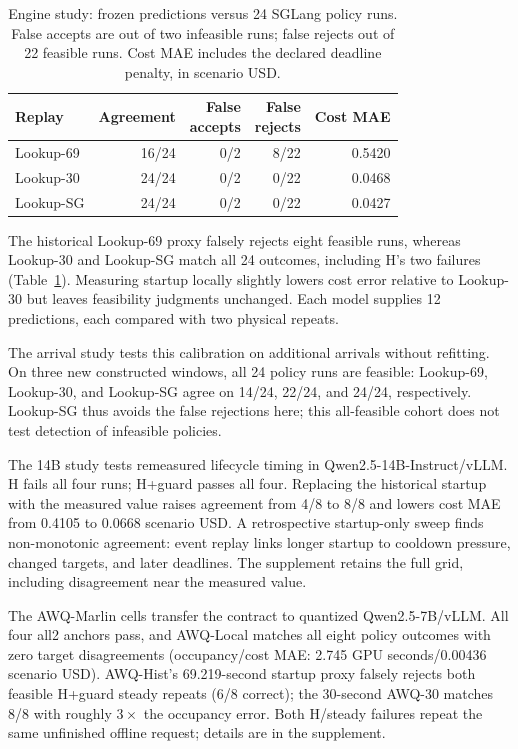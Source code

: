 \begin{table}[t]
\centering
\small
\caption{Engine study: frozen predictions versus 24 SGLang policy runs. False accepts
are out of two infeasible runs; false rejects out of 22 feasible runs.
Cost MAE includes the declared deadline penalty, in scenario USD.}
\label{tab:e4prediction}
\setlength{\tabcolsep}{3pt}
\par\vspace{4pt}
\begin{tabular*}{\linewidth}{@{\extracolsep{\fill}}lrrrr@{}}
\toprule
Replay & Agreement & \shortstack{False\\accepts} & \shortstack{False\\rejects} & Cost MAE\\
\midrule
Lookup-69 & 16/24 & 0/2 & 8/22 & 0.5420\\
Lookup-30 & 24/24 & 0/2 & 0/22 & 0.0468\\
Lookup-SG & 24/24 & 0/2 & 0/22 & 0.0427\\
\bottomrule
\end{tabular*}
\end{table}

The historical Lookup-69 proxy falsely rejects eight feasible runs, whereas Lookup-30 and
Lookup-SG match all 24 outcomes, including H's two failures
(Table~\ref{tab:e4prediction}). Measuring startup locally slightly lowers
cost error relative to Lookup-30 but leaves feasibility judgments unchanged.
Each model supplies 12 predictions, each compared with two physical repeats.

The arrival study tests this calibration on additional arrivals without refitting. On three new constructed windows, all 24 policy runs are
feasible: Lookup-69, Lookup-30, and Lookup-SG agree on 14/24, 22/24, and 24/24,
respectively. Lookup-SG thus avoids the false rejections here; this
all-feasible cohort does not test detection of infeasible policies.

The 14B study tests remeasured lifecycle timing in Qwen2.5-14B-Instruct/vLLM.
H fails all four runs; H+guard passes all four. Replacing the historical
startup with the measured value raises agreement from 4/8 to 8/8 and lowers
cost MAE from 0.4105 to 0.0668 scenario USD. A retrospective startup-only sweep
finds non-monotonic agreement: event replay links longer startup to cooldown
pressure, changed targets, and later deadlines. The supplement retains the
full grid, including disagreement near the measured value.

The AWQ-Marlin cells transfer the contract to quantized Qwen2.5-7B/vLLM. All four
all2 anchors pass, and AWQ-Local matches all eight policy outcomes with zero target
disagreements (occupancy/cost MAE: 2.745 GPU seconds/0.00436 scenario USD). AWQ-Hist's
69.219-second startup proxy falsely rejects both feasible H+guard steady repeats
(6/8 correct); the 30-second AWQ-30 matches 8/8 with roughly $3\times$ the occupancy error. Both
H/steady failures repeat the same unfinished offline request; details are in the
supplement.

